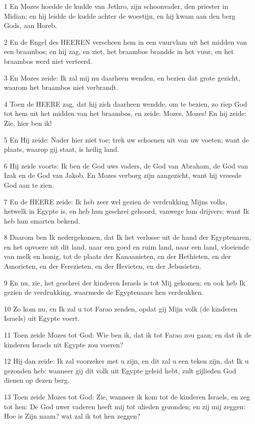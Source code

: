 \par 1 En Mozes hoedde de kudde van Jethro, zijn schoonvader, den priester in Midian; en hij leidde de kudde achter de woestijn, en hij kwam aan den berg Gods, aan Horeb.
\par 2 En de Engel des HEEREN verscheen hem in een vuurvlam uit het midden van een braambos; en hij zag, en ziet, het braambos brandde in het vuur, en het braambos werd niet verteerd.
\par 3 En Mozes zeide: Ik zal mij nu daarheen wenden, en bezien dat grote gezicht, waarom het braambos niet verbrandt.
\par 4 Toen de HEERE zag, dat hij zich daarheen wendde, om te bezien, zo riep God tot hem uit het midden van het braambos, en zeide: Mozes, Mozes! En hij zeide: Zie, hier ben ik!
\par 5 En Hij zeide: Nader hier niet toe; trek uw schoenen uit van uw voeten; want de plaats, waarop gij staat, is heilig land.
\par 6 Hij zeide voorts: Ik ben de God uws vaders, de God van Abraham, de God van Izak en de God van Jakob. En Mozes verborg zijn aangezicht, want hij vreesde God aan te zien.
\par 7 En de HEERE zeide: Ik heb zeer wel gezien de verdrukking Mijns volks, hetwelk in Egypte is, en heb hun geschrei gehoord, vanwege hun drijvers; want Ik heb hun smarten bekend.
\par 8 Daarom ben Ik nedergekomen, dat Ik het verlosse uit de hand der Egyptenaren, en het opvoere uit dit land, naar een goed en ruim land, naar een land, vloeiende van melk en honig, tot de plaats der Kanaanieten, en der Hethieten, en der Amorieten, en der Ferezieten, en der Hevieten, en der Jebusieten.
\par 9 En nu, zie, het geschrei der kinderen Israels is tot Mij gekomen; en ook heb Ik gezien de verdrukking, waarmede de Egyptenaars hen verdrukken.
\par 10 Zo kom nu, en Ik zal u tot Farao zenden, opdat gij Mijn volk (de kinderen Israels) uit Egypte voert.
\par 11 Toen zeide Mozes tot God: Wie ben ik, dat ik tot Farao zou gaan; en dat ik de kinderen Israels uit Egypte zou voeren?
\par 12 Hij dan zeide: Ik zal voorzeker met u zijn, en dit zal u een teken zijn, dat Ik u gezonden heb: wanneer gij dit volk uit Egypte geleid hebt, zult gijlieden God dienen op dezen berg.
\par 13 Toen zeide Mozes tot God: Zie, wanneer ik kom tot de kinderen Israels, en zeg tot hen: De God uwer vaderen heeft mij tot ulieden gezonden; en zij mij zeggen: Hoe is Zijn naam? wat zal ik tot hen zeggen?
